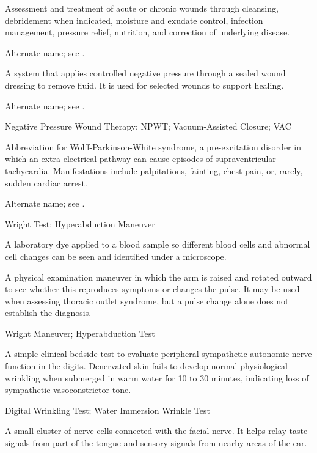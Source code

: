  Assessment and treatment of acute or chronic wounds through cleansing, debridement when indicated, moisture and exudate control, infection management, pressure relief, nutrition, and correction of underlying disease.

 Alternate name; see .

 A system that applies controlled negative pressure through a sealed wound dressing to remove fluid. It is used for selected wounds to support healing.

 Alternate name; see .

\synonyms
Negative Pressure Wound Therapy; NPWT; Vacuum-Assisted Closure; VAC

 Abbreviation for Wolff-Parkinson-White syndrome, a pre-excitation disorder in which an extra electrical pathway can cause episodes of supraventricular tachycardia. Manifestations include palpitations, fainting, chest pain, or, rarely, sudden cardiac arrest.

 Alternate name; see .

\synonyms
Wright Test; Hyperabduction Maneuver

 A laboratory dye applied to a blood sample so different blood cells and abnormal cell changes can be seen and identified under a microscope.

 A physical examination maneuver in which the arm is raised and rotated outward to see whether this reproduces symptoms or changes the pulse. It may be used when assessing thoracic outlet syndrome, but a pulse change alone does not establish the diagnosis.

\synonyms
Wright Maneuver; Hyperabduction Test

 A simple clinical bedside test to evaluate peripheral sympathetic autonomic nerve function in the digits. Denervated skin fails to develop normal physiological wrinkling when submerged in warm water for 10 to 30 minutes, indicating loss of sympathetic vasoconstrictor tone.

\synonyms
Digital Wrinkling Test; Water Immersion Wrinkle Test

 A small cluster of nerve cells connected with the facial nerve. It helps relay taste signals from part of the tongue and sensory signals from nearby areas of the ear.

